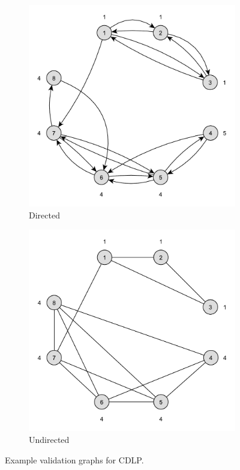 \begin{figure}[h]
	\centering
	\begin{subfigure}{0.496\textwidth}
		\centering
		\includegraphics[scale=\examplescale]{figures/examples/cdlp-dir.pdf}
		\caption{Directed}
	\end{subfigure}
	\begin{subfigure}{0.496\textwidth}
		\centering
		\includegraphics[scale=\examplescale]{figures/examples/cdlp-undir.pdf}
		\caption{Undirected}
	\end{subfigure}
	\caption{Example validation graphs for CDLP.}
	\label{fig:cdlp_example}
\end{figure}

